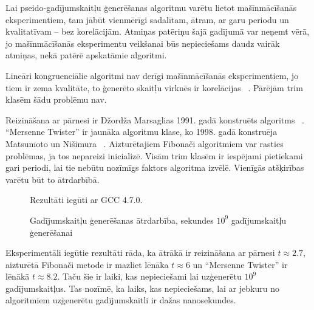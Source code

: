 \documentclass{ludis}
\begin{document}
Lai pseido-gadījumskaitļu ģenerēšanas algoritmu varētu lietot mašīnmācīšanās eksperimentiem, tam jābūt vienmērīgi sadalītam, ātram, ar garu periodu un kvalitatīvam -- bez korelācijām. Atmiņas patēriņu šajā gadījumā var neņemt vērā, jo mašīnmācīšanās eksperimentu veikšanai būs nepieciešams daudz vairāk atmiņas, nekā patērē apskatāmie algoritmi.

Lineāri kongruenciālie algoritmi nav derīgi mašīnmācīšanās eksperimentiem, jo tiem ir zema kvalitāte, to ģenerēto skaitļu virknēs ir korelācijas ~\cite{rng_miller_park}. Pārējām trim klasēm šādu problēmu nav.

Reizināšana ar pārnesi ir Džordža Marsaglias 1991. gadā konstruēts algoritms ~\cite{rng_new_marsaglia}. ``Mersenne Twister'' ir jaunāka algoritmu klase, ko 1998. gadā konstruēja Matsumoto un Nišimura ~\cite{rng_mersenne}. Aizturētajiem Fibonači algoritmiem var rasties problēmas, ja tos nepareizi inicializē. Visām trim klasēm ir iespējami pietiekami gari periodi, lai tie nebūtu nozīmīgs faktors algoritma izvēlē. Vienīgās atšķirības varētu būt to ātrdarbībā. 
\begin{figure}
  \centering
  \caption[Gadījumskaitļu ģeneratoru ātrdarbība]{Gadījumskaitļu ģenerēšanas ātrdarbība, sekundes $10^9$ gadījumskaitļu ģenerēšanai}
  Rezultāti iegūti ar GCC 4.7.0.
  \label{fig:rng_performance}
\end{figure}
Eksperimentāli iegūtie rezultāti rāda, ka ātrākā ir reizināšana ar pārnesi $t \approx 2.7$, aizturētā Fibonači metode ir mazliet lēnāka $t \approx 6$ un ``Mersenne Twister'' ir lēnākā $t \approx 8.2$. Taču šie ir laiki, kas nepieciešami lai uzģenerētu $10^9$ gadījumskaitļus. Tas nozīmē, ka laiks, kas nepieciešams, lai ar jebkuru no algoritmiem uzģenerētu gadījumskaitli ir dažas nanosekundes.
\end{document}
